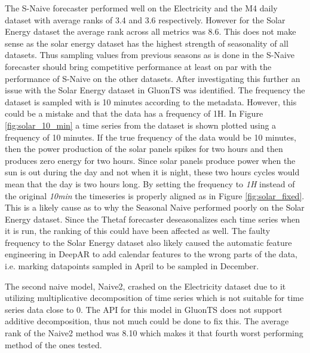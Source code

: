 The S-Naive forecaster performed well on the Electricity and the M4 daily dataset with average ranks of 3.4 and 3.6 respectively. However for the Solar Energy dataset the average rank across all metrics was 8.6. This does not make sense as the solar energy dataset has the highest strength of seasonality of all datasets. Thus sampling values from previous seasons as is done in the S-Naive forecaster should bring competitive performance at least on par with the performance of S-Naive on the other datasets. After investigating this further an issue with the Solar Energy dataset in GluonTS was identified. The frequency the dataset is sampled with is 10 minutes according to the metadata. However, this could be a mistake and that the data has a frequency of 1H. In Figure \ref{fig:solar_10_min} a time series from the dataset is shown plotted using a frequency of 10 minutes. If the true frequency of the data would be 10 minutes, then the power production of the solar panels spikes for two hours and then produces zero energy for two hours. Since solar panels produce power when the sun is out during the day and not when it is night, these two hours cycles would mean that the day is two hours long. By setting the frequency to \textit{1H} instead of the original \textit{10min} the timeseries is properly aligned as in Figure \ref{fig:solar_fixed}. This is a likely cause as to why the Seasonal Naive performed poorly on the Solar Energy dataset. Since the Thetaf forecaster deseasonalizes each time series when it is run, the ranking of this could have been affected as well. The faulty frequency to the Solar Energy dataset also likely caused the automatic feature engineering in DeepAR to add calendar features to the wrong parts of the data, i.e. marking datapoints sampled in April to be sampled in December.

The second naive model, Naive2, crashed on the Electricity dataset due to it utilizing multiplicative decomposition of time series which is not suitable for time series data close to 0. The API for this model in GluonTS does not support additive decomposition, thus not much could be done to fix this. The average rank of the Naive2 method was 8.10 which makes it that fourth worst performing method of the ones tested.

